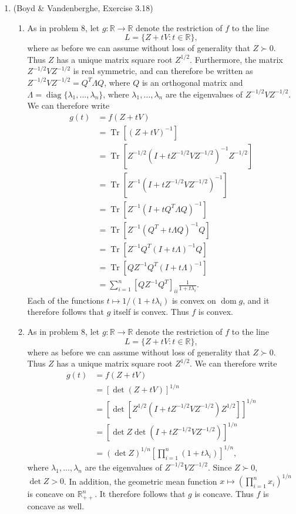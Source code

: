 \documentclass[letterpaper,12pt]{article}
\DeclareMathOperator{\Tr}{Tr}
\DeclareMathOperator{\dom}{dom}
\DeclareMathOperator{\diag}{diag}
\begin{document}
\begin{enumerate}
\item (Boyd \& Vandenberghe, Exercise 3.18)
\begin{enumerate}
\item As in problem 8, let $g : \mathbb{R} \to \mathbb{R}$ denote the
  restriction of $f$ to the line
  \begin{equation*}
    L = \{Z + tV : t \in \mathbb{R}\},
  \end{equation*}
  where as before we can assume without loss of generality that
  $Z \succ 0$. Thus $Z$ has a unique matrix square root
  $Z^{1/2}$. Furthermore, the matrix $Z^{-1/2}VZ^{-1/2}$ is real
  symmetric, and can therefore be written as
  $Z^{-1/2}VZ^{-1/2} = Q^T \Lambda Q$, where $Q$ is an orthogonal
  matrix and $\Lambda = \diag\{\lambda_1, \ldots, \lambda_n\}$, where
  $\lambda_1, \ldots, \lambda_n$ are the eigenvalues of
  $Z^{-1/2}VZ^{-1/2}$. We can therefore write
  \begin{align*}
    g(t) &= f(Z + tV) \\
      &= \Tr[(Z + tV)^{-1}] \\
      &= \Tr[Z^{-1/2}(I + tZ^{-1/2}VZ^{-1/2})^{-1}Z^{-1/2}] \\
      &= \Tr[Z^{-1}(I + tZ^{-1/2}VZ^{-1/2})^{-1}] \\
      &= \Tr[Z^{-1}(I + tQ^T \Lambda Q)^{-1}] \\
      &= \Tr[Z^{-1}(Q^T + t\Lambda Q)^{-1} Q] \\
      &= \Tr[Z^{-1}Q^T (I + t\Lambda)^{-1} Q] \\
      &= \Tr[Q Z^{-1}Q^T (I + t\Lambda)^{-1}] \\
      &= \sum_{i=1}^n [Q Z^{-1} Q^T]_{ii} \frac{1}{1 + t\lambda_i}.
  \end{align*}
  Each of the functions $t \mapsto 1 / (1 + t\lambda_i)$ is convex on
  $\dom g$, and it therefore follows that $g$ itself is convex. Thus
  $f$ is convex.

\item As in problem 8, let $g : \mathbb{R} \to \mathbb{R}$ denote the
  restriction of $f$ to the line
  \begin{equation*}
    L = \{Z + tV : t \in \mathbb{R}\},
  \end{equation*}
  where as before we can assume without loss of generality that
  $Z \succ 0$. Thus $Z$ has a unique matrix square root
  $Z^{1/2}$. We can therefore write
  \begin{align*}
    g(t) &= f(Z + tV) \\
      &= [\det(Z + tV)]^{1/n} \\
      &= [\det[Z^{1/2}(I + tZ^{-1/2}VZ^{-1/2})Z^{1/2}]]^{1/n} \\
      &= [\det Z \det(I + tZ^{-1/2}VZ^{-1/2})]^{1/n} \\
      &= (\det Z)^{1/n} \left [ \prod_{i=1}^n (1 + t\lambda_i) \right ]^{1/n},
  \end{align*}
  where $\lambda_1, \ldots, \lambda_n$ are the eigenvalues of
  $Z^{-1/2}VZ^{-1/2}$. Since $Z \succ 0$, $\det Z > 0$. In addition,
  the geometric mean function $x \mapsto (\prod_{i=1}^n x_i)^{1/n}$ is
  concave on $\mathbb{R}^n_{++}$. It therefore follows that $g$ is
  concave. Thus $f$ is concave as well.


\end{enumerate}
\end{enumerate}
\end{document}
